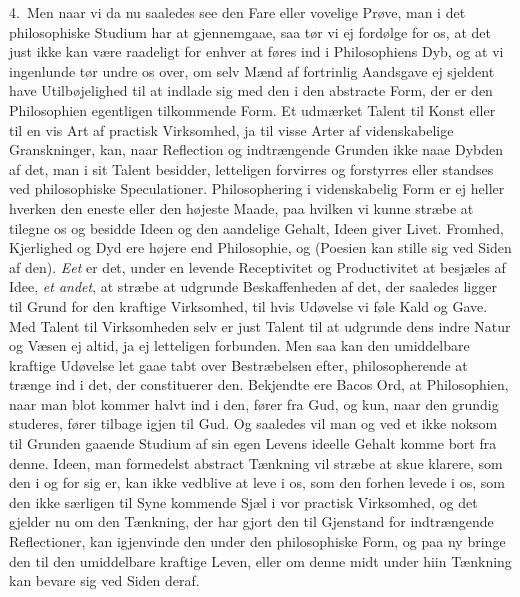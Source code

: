 \documentclass[12pt,a4paper]{book}
\newcommand{\apage}[1]{\marginnote{\footnotesize\textit{[#1]}}}
\begin{document}
4.~Men naar vi da nu saaledes see den Fare eller vovelige Prøve, man i det
philosophiske Studium har at gjennemgaae, saa tør vi ej fordølge for os, at det
just ikke kan være raadeligt for enhver at føres ind i Philosophiens Dyb, og at vi
ingenlunde tør undre os over, om selv Mænd af fortrinlig Aandsgave ej sjeldent have
Utilbøjelighed til at indlade sig med den i den abstracte Form, der er den
Philosophien egentligen tilkommende Form. Et udmærket Talent til Konst eller til en
vis Art af practisk Virksomhed, ja til visse Arter af videnskabelige Granskninger,
kan, naar Reflection og indtrængende Grunden ikke naae Dybden af det, man i sit
Talent besidder, letteligen forvirres og forstyrres eller standses ved
philosophiske Speculationer. Philosophering i videnskabelig Form er ej heller
hverken den eneste eller den højeste Maade, paa hvilken vi kunne stræbe at tilegne
os og besidde Ideen og den aandelige Gehalt, Ideen giver Livet. Fromhed,
Kjerlighed og Dyd ere højere end Philosophie, og \apage{193} (Poesien kan stille sig ved Siden
af den). \emph{Eet} er det, under en levende Receptivitet og Productivitet at besjæles af
Idee, \emph{et andet}, at stræbe at udgrunde Beskaffenheden af det, der saaledes ligger
til Grund for den kraftige Virksomhed, til hvis Udøvelse vi føle Kald og Gave. Med
Talent til Virksomheden selv er just Talent til at udgrunde dens indre Natur og
Væsen ej altid, ja ej letteligen forbunden. Men saa kan den umiddelbare kraftige
Udøvelse let gaae tabt over Bestræbelsen efter, philosopherende at trænge ind i
det, der constituerer den. Bekjendte ere Bacos Ord, at Philosophien, naar man blot
kommer halvt ind i den, fører fra Gud, og kun, naar den grundig studeres, fører
tilbage igjen til Gud. Og saaledes vil man og ved et ikke noksom til Grunden
gaaende Studium af sin egen Levens ideelle Gehalt komme bort fra denne. Ideen, man
formedelst abstract Tænkning vil stræbe at skue klarere, som den i og for sig er,
kan ikke vedblive at leve i os, som den forhen levede i os, som den ikke særligen
til Syne kommende Sjæl i vor practisk Virksomhed, og det gjelder nu om den
Tænkning, der har gjort den til Gjenstand for indtrængende Reflectioner, kan
igjenvinde den under den philosophiske Form, og paa ny bringe den til den
umiddelbare kraftige Leven, eller om denne midt under hiin Tænkning kan bevare sig
ved Siden deraf.
\end{document}
